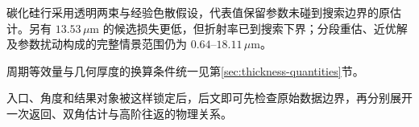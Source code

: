 碳化硅行采用透明两束与经验色散假设，代表值保留参数未碰到搜索边界的原估计。另有 $13.53\,\mu\mathrm{m}$ 的候选损失更低，但折射率已到搜索下界；分段重估、近优解及参数扰动构成的完整情景范围仍为 $0.64$--$18.11\,\mu\mathrm{m}$。

周期等效量与几何厚度的换算条件统一见第\ref{sec:thickness-quantities}节。

入口、角度和结果对象被这样锁定后，后文即可先检查原始数据边界，再分别展开一次返回、双角估计与高阶往返的物理关系。
